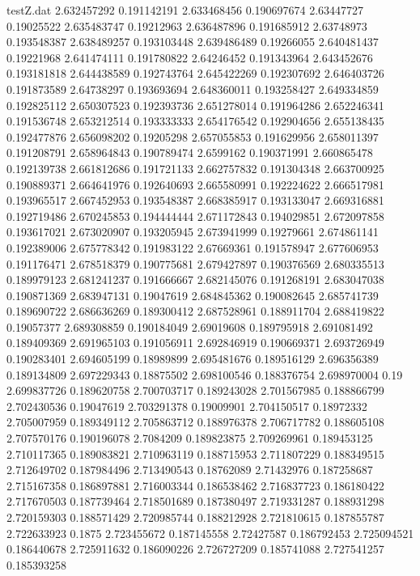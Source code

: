 \begin{filecontents*}{testZ.dat}
2.632457292  0.191142191
2.633468456  0.190697674
2.63447727  0.19025522
2.635483747  0.19212963
2.636487896  0.191685912
2.63748973  0.193548387
2.638489257  0.193103448
2.639486489  0.19266055
2.640481437  0.19221968
2.641474111  0.191780822
2.64246452  0.191343964
2.643452676  0.193181818
2.644438589  0.192743764
2.645422269  0.192307692
2.646403726  0.191873589
2.64738297  0.193693694
2.648360011  0.193258427
2.649334859  0.192825112
2.650307523  0.192393736
2.651278014  0.191964286
2.652246341  0.191536748
2.653212514  0.193333333
2.654176542  0.192904656
2.655138435  0.192477876
2.656098202  0.19205298
2.657055853  0.191629956
2.658011397  0.191208791
2.658964843  0.190789474
2.6599162  0.190371991
2.660865478  0.192139738
2.661812686  0.191721133
2.662757832  0.191304348
2.663700925  0.190889371
2.664641976  0.192640693
2.665580991  0.192224622
2.666517981  0.193965517
2.667452953  0.193548387
2.668385917  0.193133047
2.669316881  0.192719486
2.670245853  0.194444444
2.671172843  0.194029851
2.672097858  0.193617021
2.673020907  0.193205945
2.673941999  0.19279661
2.674861141  0.192389006
2.675778342  0.191983122
2.67669361  0.191578947
2.677606953  0.191176471
2.678518379  0.190775681
2.679427897  0.190376569
2.680335513  0.189979123
2.681241237  0.191666667
2.682145076  0.191268191
2.683047038  0.190871369
2.683947131  0.19047619
2.684845362  0.190082645
2.685741739  0.189690722
2.686636269  0.189300412
2.687528961  0.188911704
2.688419822  0.19057377
2.689308859  0.190184049
2.69019608  0.189795918
2.691081492  0.189409369
2.691965103  0.191056911
2.692846919  0.190669371
2.693726949  0.190283401
2.694605199  0.18989899
2.695481676  0.189516129
2.696356389  0.189134809
2.697229343  0.18875502
2.698100546  0.188376754
2.698970004  0.19
2.699837726  0.189620758
2.700703717  0.189243028
2.701567985  0.188866799
2.702430536  0.19047619
2.703291378  0.19009901
2.704150517  0.18972332
2.705007959  0.189349112
2.705863712  0.188976378
2.706717782  0.188605108
2.707570176  0.190196078
2.7084209  0.189823875
2.709269961  0.189453125
2.710117365  0.189083821
2.710963119  0.188715953
2.711807229  0.188349515
2.712649702  0.187984496
2.713490543  0.18762089
2.71432976  0.187258687
2.715167358  0.186897881
2.716003344  0.186538462
2.716837723  0.186180422
2.717670503  0.187739464
2.718501689  0.187380497
2.719331287  0.188931298
2.720159303  0.188571429
2.720985744  0.188212928
2.721810615  0.187855787
2.722633923  0.1875
2.723455672  0.187145558
2.72427587  0.186792453
2.725094521  0.186440678
2.725911632  0.186090226
2.726727209  0.185741088
2.727541257  0.185393258

\end{filecontents*}
